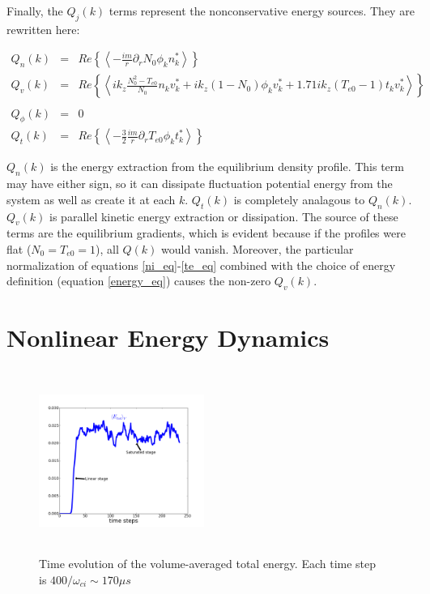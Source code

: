 \documentclass[12pt]{article}
\def\beqar{\begin{eqnarray}}
\def\eeqar{\end{eqnarray}}
\newcommand{\pdr}{\partial_r}
\begin{document}
Finally, the $Q_j(k)$ terms represent the nonconservative energy sources. They are rewritten here:

\beqar
Q_n(k) & = & Re \left\{ \left< -\frac{i m}{r} \pdr N_0 \phi_k n_k^*  \right> \right\}
\label{Qnk} \\
Q_v(k) & = & Re \left\{ \left<  i k_z \frac{N_0^2 - T_{e0}}{N_0} n_k v_k^* + i k_z (1 - N_0) \phi_k v_k^* + 1.71 i k_z (T_{e0} -1) t_k v_k^*  \right> \right\} \\
\label{Qvk} \\
Q_\phi(k) & = & 0
\label{Qpk} \\
Q_t(k) & = & Re \left\{ \left< -\frac{3}{2} \frac{i m}{r} \pdr T_{e0} \phi_k t_k^*  \right> \right\}
\label{Qtk}
\eeqar

$Q_n(k)$ is the energy extraction from the equilibrium density profile. This term may have either sign, so it can dissipate fluctuation potential energy from the system as well as create it
at each $k$. $Q_t(k)$ is completely analagous to $Q_n(k)$. 
$Q_v(k)$ is parallel kinetic energy extraction or dissipation. The source of these terms are the equilibrium gradients, which is evident because if the profiles
were flat ($N_0=T_{e0}=1$), all $Q(k)$ would vanish.
Moreover, the particular normalization of equations \ref{ni_eq}-\ref{te_eq} combined with the choice of energy definition (equation \ref{energy_eq}) causes the non-zero $Q_v(k)$.

\section{Nonlinear Energy Dynamics}
\label{nl_en_dynamics_sec}

\begin{figure}
\includegraphics[width=0.48\textwidth,height=60mm]{time_evolution}
\hfil
\caption{Time evolution of the volume-averaged total energy. Each time step is $400/\omega_{ci} \sim 170 \mu s$}
\label{time_evolution}
\end{figure}
\end{document}

